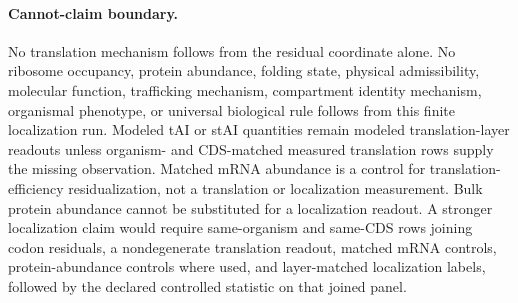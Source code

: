 \paragraph{Cannot-claim boundary.}
No translation mechanism follows from the residual coordinate alone. No ribosome occupancy, protein abundance, folding state, physical admissibility, molecular function, trafficking mechanism, compartment identity mechanism, organismal phenotype, or universal biological rule follows from this finite localization run. Modeled tAI or stAI quantities remain modeled translation-layer readouts unless organism- and CDS-matched measured translation rows supply the missing observation. Matched mRNA abundance is a control for translation-efficiency residualization, not a translation or localization measurement. Bulk protein abundance cannot be substituted for a localization readout. A stronger localization claim would require same-organism and same-CDS rows joining codon residuals, a nondegenerate translation readout, matched mRNA controls, protein-abundance controls where used, and layer-matched localization labels, followed by the declared controlled statistic on that joined panel.